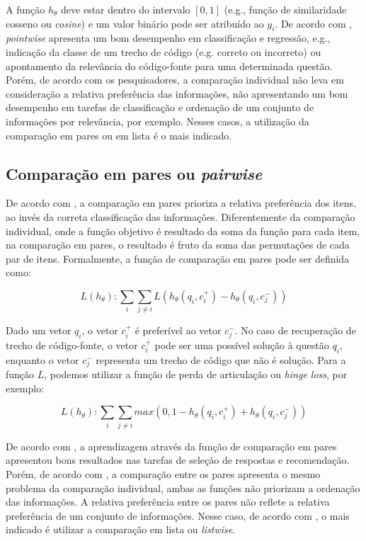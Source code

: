 A função $h_{\theta}$ deve estar dentro do intervalo $[0, 1]$ (e.g., função de similaridade cosseno ou \textit{cosine}) e um valor binário pode ser atribuído ao $y_{i}$. De acordo com \cite{guo-deep-look-into-neural-ranking-models:2019, wu-sql-rank-listwise-approach:2018},  \textit{pointwise} apresenta um bom desempenho em classificação e regressão, e.g., indicação da classe de um trecho de código (e.g. correto ou incorreto) ou apontamento da relevância do código-fonte para uma determinada questão. Porém, de acordo com os pesquisadores, a comparação individual não leva em consideração a relativa preferência das informações, não apresentando um bom desempenho em tarefas de classificação e ordenação de um conjunto de informações por relevância, por exemplo. Nesses casos, a utilização da comparação em pares ou em lista é o mais indicado.


\subsection{Comparação em pares ou \textit{pairwise}}

De acordo com \cite{guo-deep-look-into-neural-ranking-models:2019}, a comparação em pares prioriza a relativa preferência dos itens, ao invés da correta classificação das informações. Diferentemente da comparação individual, onde a função objetivo é resultado da soma da função para cada item, na comparação em pares, o resultado é fruto da soma das permutações de cada par de itens. Formalmente, a função de comparação em pares pode ser definida como:

\begin{equation}
    L (h_{\theta}): \sum_{i} \sum_{j \neq i} L( h_{\theta}(q_{i}, c_{i}^{+}) - h_{\theta}(q_{i}, c_{j}^{-})) 
\end{equation}

 Dado um vetor $q_{i}$, o vetor $c_{i}^{+}$ é preferível ao vetor $c_{j}^{-}$. No caso de recuperação de trecho de código-fonte, o vetor $c_{i}^{+}$ pode ser uma possível solução à questão $q_{i}$, enquanto o vetor $c_{j}^{-}$ representa um trecho de código que não é solução. Para a função $L$, podemos utilizar a função de perda de articulação ou \textit{hinge loss}, por exemplo:

\begin{equation}
    L (h_{\theta}): \sum_{i} \sum_{j \neq i} max(0, 1 - h_{\theta}(q_{i}, c_{i}^{+}) + h_{\theta}(q_{i}, c_{j}^{-})) 
\end{equation}

De acordo com \cite{feng-2015, guo-deep-look-into-neural-ranking-models:2019, wu-sql-rank-listwise-approach:2018}, a aprendizagem através da função de comparação em pares apresentou bons resultados nas tarefas de seleção de respostas e recomendação. Porém, de acordo com \cite{wu-sql-rank-listwise-approach:2018}, a comparação entre os pares apresenta o mesmo problema da comparação individual, ambas as funções não priorizam a ordenação das informações. A relativa preferência entre os pares não reflete a relativa preferência de um conjunto de informações. Nesse caso, de acordo com \cite{wu-sql-rank-listwise-approach:2018}, o mais indicado é utilizar a comparação em lista ou \textit{listwise}.


